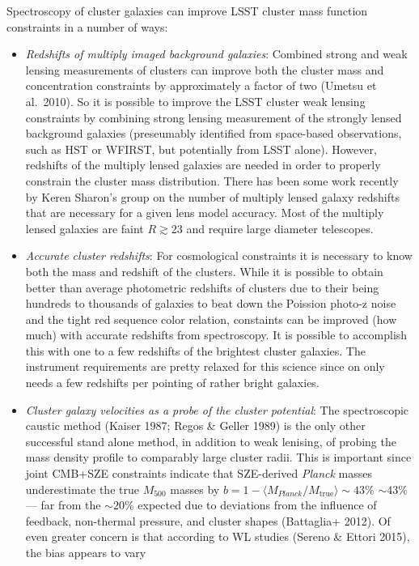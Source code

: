 \begin{enumerate}
Spectroscopy of cluster galaxies can improve LSST cluster mass function
constraints in a number of ways:
\begin{itemize}
  \item {\it Redshifts of multiply imaged background galaxies}: Combined strong
  and weak lensing measurements of clusters can improve both the cluster mass
  and concentration constraints by approximately a factor of two (Umetsu et
  al.~2010). So it is possible to improve the LSST cluster weak lensing
  constraints by combining strong lensing measurement of the strongly lensed
  background galaxies (preseumably identified from space-based observations,
  such as HST or WFIRST, but potentially from LSST alone). However, redshifts of
  the multiply lensed galaxies are needed in order to properly constrain the
  cluster mass distribution. There has been some work recently by Keren Sharon's
  group on the number of multiply lensed galaxy redshifts that are necessary for
  a given lens model accuracy. Most of the multiply lensed galaxies are faint $R
  \gtrsim 23$ and require large diameter telescopes.
  \item {\it Accurate cluster redshifts}: For cosmological constraints it is
  necessary to know both the mass and redshift of the clusters. While it is
  possible to obtain better than average photometric redshifts of clusters due
  to their being hundreds to thousands of galaxies to beat down the Poission
  photo-z noise and the tight red sequence color relation, constaints can be
  improved (how much) with accurate redshifts from spectroscopy. It is possible
  to accomplish this with one to a few redshifts of the brightest cluster
  galaxies. The instrument requirements are pretty relaxed for this science
  since on only needs a few redshifts per pointing of rather bright galaxies.
  \item {\it Cluster galaxy velocities as a probe of the cluster potential}: The
  spectroscopic caustic method (Kaiser 1987; Regos \& Geller 1989) is the only
  other successful stand alone method, in addition to weak lenising, of probing
  the mass density profile to comparably large cluster radii. This is important
  since joint CMB+SZE constraints indicate that SZE-derived {\em Planck} masses
  underestimate the true $M_{500}$ masses by $b=1-\langle
  M_{Planck}/M_\mathrm{true}\rangle\sim 43\%$ $\sim43\%$ --- far from the $\sim
  20\%$ expected due to deviations from the influence of feedback, non-thermal
  pressure, and cluster shapes (Battaglia+ 2012). Of even greater concern is
  that according to WL studies (Sereno \& Ettori 2015), the bias appears to vary

\end{itemize}
\end{enumerate}
